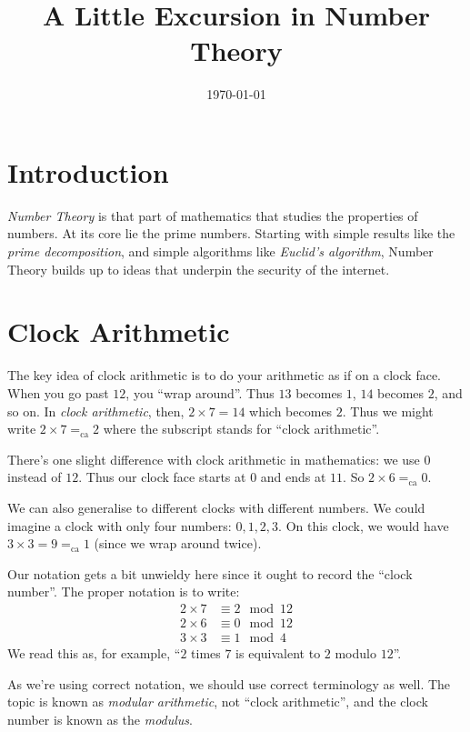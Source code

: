 \documentclass[
  html5,
  mathml,
  use filename
]{internet}
\title{A Little Excursion in Number Theory}
\date{\today}
\begin{document}
\maketitle
\tableofcontents

\section{Introduction}

\emph{Number Theory} is that part of mathematics that studies the properties of numbers.
At its core lie the prime numbers.
Starting with simple results like the \emph{prime decomposition}, and simple algorithms like \emph{Euclid's algorithm}, Number Theory builds up to ideas that underpin the security of the internet.

\section{Clock Arithmetic}

The key idea of clock arithmetic is to do your arithmetic as if on a clock face.
When you go past \(12\), you ``wrap around''.
Thus \(13\) becomes \(1\), \(14\) becomes \(2\), and so on.
In \emph{clock arithmetic}, then, \(2 \times 7 = 14\) which becomes \(2\).
Thus we might write \(2 \times 7 =_{\mathrm{c a}} 2\) where the subscript stands for ``clock arithmetic''.

There's one slight difference with clock arithmetic in mathematics: we use \(0\) instead of \(12\).
Thus our clock face starts at \(0\) and ends at \(11\).
So \(2 \times 6 =_{\mathrm{c a}} 0\).

We can also generalise to different clocks with different numbers.
We could imagine a clock with only four numbers: \(0,1,2,3\).
On this clock, we would have \(3 \times 3 = 9 =_{\mathrm{c a}} 1\) (since we wrap around twice).

Our notation gets a bit unwieldy here since it ought to record the ``clock number''.
The proper notation is to write:
%
\begin{align*}
2 \times 7 &\equiv 2 \mod 12 \\
2 \times 6 &\equiv 0 \mod 12 \\
3 \times 3 &\equiv 1 \mod 4
\end{align*}
%
We read this as, for example, ``\(2\) times \(7\) is equivalent to \(2\) modulo \(12\)''.

As we're using correct notation, we should use correct terminology as well.
The topic is known as \emph{modular arithmetic}, not ``clock arithmetic'', and the clock number is known as the \emph{modulus}.
\end{document}
